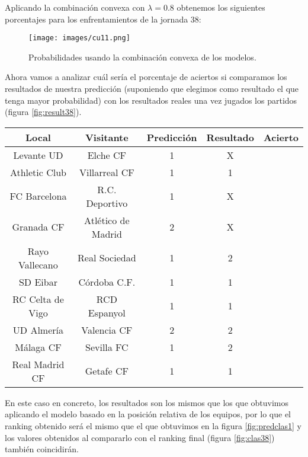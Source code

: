Aplicando la combinación convexa con $\lambda=0.8$ obtenemos los siguientes porcentajes para los enfrentamientos de la jornada 38:

\begin{figure}[H]
	\centering
	\texttt{[image: images/cu11.png]}
	\caption{Probabilidades usando la combinación convexa de los modelos.}
\end{figure}

Ahora vamos a analizar cuál sería el porcentaje de aciertos si comparamos los resultados de nuestra predicción (suponiendo que elegimos como resultado el que tenga mayor probabilidad) con los resultados reales una vez jugados los partidos (figura \ref{fig:result38}).

\begin{center}
	\begin{tabular}{|c|c|c|c|c|}
		\hline \rowcolor{ao} Local & Visitante & Predicción & Resultado & Acierto \\ 
		\hline Levante UD & Elche CF & 1 & X & \begingroup\color{red}\xmark\endgroup \\ 
		\hline Athletic Club & Villarreal CF & 1 & 1 & \begingroup\color{green}\cmark\endgroup \\ 
		\hline FC Barcelona & R.C. Deportivo & 1 & X & \begingroup\color{red}\xmark\endgroup \\ 
		\hline Granada CF & Atlético de Madrid & 2 & X & \begingroup\color{red}\xmark\endgroup \\ 
		\hline Rayo Vallecano & Real Sociedad & 1 & 2 & \begingroup\color{red}\xmark\endgroup \\ 
		\hline SD Eibar & Córdoba C.F. & 1 & 1 & \begingroup\color{green}\cmark\endgroup \\ 
		\hline RC Celta de Vigo & RCD Espanyol & 1 & 1 & \begingroup\color{green}\cmark\endgroup \\ 
		\hline UD Almería & Valencia CF & 2 & 2 & \begingroup\color{green}\cmark\endgroup \\ 
		\hline Málaga CF & Sevilla FC & 1 & 2 & \begingroup\color{red}\xmark\endgroup \\ 
		\hline Real Madrid CF & Getafe CF & 1 & 1 & \begingroup\color{green}\cmark\endgroup \\ 
		\hline 
	\end{tabular} 
\end{center}

En este caso en concreto, los resultados son los mismos que los que obtuvimos aplicando el modelo basado en la posición relativa de los equipos, por lo que el ranking obtenido será el mismo que el que obtuvimos en la figura \ref{fig:predclas1} y los valores obtenidos al compararlo con el ranking final (figura \ref{fig:clas38}) también coincidirán.\\

